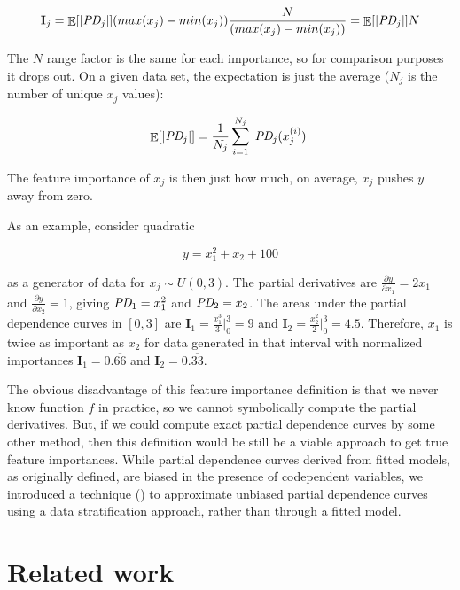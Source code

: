 \documentclass[12pt]{article}
\newcommand{\todo}[1]{{{\color{red}{[#1]}}}}
\newcommand{\Ex}{\mathop{\mathbb{E}}}
\newcommand{\Imp}{\mathbf{I}}
\begin{document}
\[
\Imp_j = \Ex[|\text{\it PD}_j|] (max(x_j) -min(x_j)) \frac{N}{(max(x_j) -min(x_j))} = \Ex[|\text{\it PD}_j|] N
\]

\todo{say we normalized so they are comparable; normalized to N not arbitrary $x_j$ range, or just say that we normalize to 0..1 without loss of generality; same as multiplying by that factor}

\noindent The $N$ range factor is the same for each importance, so for comparison purposes it drops out.  On a given data set, the expectation is just the average ($N_j$ is the number of unique $x_j$ values):

\begin{equation}\label{eq:Epd}
\Ex[|\text{\it PD}_j|] = \frac{1}{N_j} \sum_{i=1}^{N_j} |\text{\it PD}_j(x_j^{(i)})|
\end{equation}

\noindent The feature importance of $x_j$ is then just how much, on average, $x_j$ pushes $y$ away from zero.  

As an example, consider quadratic

\begin{equation}\label{eq:quad}
y = x_1^2 + x_2 + 100
\end{equation}

\noindent as a generator of data for $x_j \sim U(0,3)$. The partial derivatives are $\frac{\partial y}{\partial x_1} = 2 x_1$ and $\frac{\partial y}{\partial x_2} = 1$, giving $\text{\it PD}_1 = x_1^2$ and $\text{\it PD}_2 = x_2$. The areas under the partial dependence curves in $[0,3]$ are $\Imp_1 = \frac{x_1^3}{3} \big |_0^3 = 9$ and $\Imp_2 = \frac{x_2^2}{2} \big |_0^3 = 4.5$.   Therefore, $x_1$ is twice as important as $x_2$ for data generated in that interval with normalized importances $\Imp_1 = 0.\overline{66}$ and $\Imp_2 = 0.\overline{33}$.

The obvious disadvantage of this feature importance definition is that we never know function $f$ in practice, so we cannot symbolically compute the partial derivatives. But, if we could  compute exact partial dependence curves by some other method, then this definition would be still be a viable approach to get true feature importances. While partial dependence curves derived from fitted models, as originally defined, are biased in the presence of codependent variables, we introduced a technique (\cite{stratpd}) to approximate unbiased partial dependence curves using a data stratification approach, rather than through a fitted model.

\section{Related work}
\end{document}
